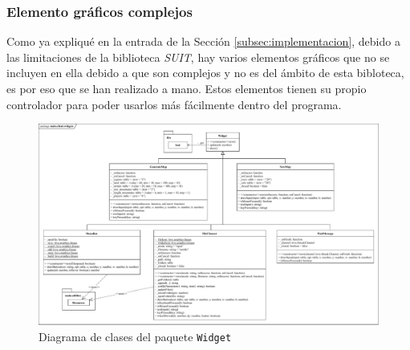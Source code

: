 \subsubsection{Elemento gráficos complejos}
\label{subsubsec:widgets}

Como ya expliqué en la entrada de la Sección \ref{subsec:implementacion}, debido a las limitaciones de la biblioteca \textit{SUIT}, hay varios elementos gráficos que no se incluyen en ella debido a que son complejos y no es del ámbito de esta bibloteca, es por eso que se han realizado a mano. Estos elementos tienen su propio controlador para poder usarlos más fácilmente dentro del programa.

\begin{figure}[!h]
	\centering
	\includegraphics[width=\textwidth]{images/clases-widgets.pdf}
	\caption{Diagrama de clases del paquete \texttt{Widget}}
	\label{fig:widgetclasses}
\end{figure}

